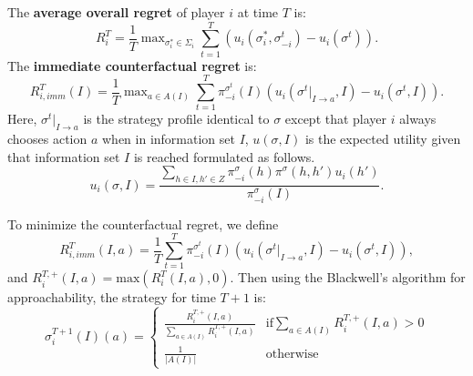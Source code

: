 \documentclass[twocolumn]{article}
\begin{document}
The \textbf{average overall regret} of player $i$ at time $T$ is:
\begin{equation}
    R^T_i = \frac{1}{T}\mathop{\text{max}}_{\sigma^{*}_i \in \Sigma_i}\sum_{t=1}^T(u_i(\sigma^{*}_i, \sigma^t_{-i}) - u_i(\sigma^t)).
\end{equation}
The \textbf{immediate counterfactual regret} is:
\begin{equation}
    R^T_{i,imm}(I) = \frac{1}{T}\mathop{\text{max}}_{a \in A(I)}\sum_{t=1}^T{\pi^{\sigma^t}_{-i}(I)(u_i(\sigma^t|_{I \rightarrow a}, I) - u_i(\sigma^t, I))}.
\end{equation}
Here, $\sigma^t|_{I \rightarrow a}$ is the strategy profile identical to $\sigma$ except that player $i$ always chooses action $a$ when in information set $I$, $u(\sigma, I)$ is the expected utility given that information set $I$ is reached formulated as follows.
\begin{equation}
    u_i(\sigma, I) = \frac{\sum_{h \in I, h' \in Z}\pi^\sigma_{-i}(h)\pi^\sigma(h,h')u_i(h')}{\pi^\sigma_{-i}(I)}.
\end{equation}

To minimize the counterfactual regret, we define
\begin{equation}
    R^T_{i,imm}(I,a) = \frac{1}{T}\sum_{t=1}^T{\pi^{\sigma^t}_{-i}(I)(u_i(\sigma^t|_{I \rightarrow a}, I) - u_i(\sigma^t, I))},
\end{equation}
and $R^{T,+}_i(I,a) = \text{max}(R^T_i(I,a),0)$. Then using the Blackwell's algorithm for approachability, the strategy for time $T+1$ is:
\begin{equation}
    \sigma^{T+1}_i(I)(a) = \begin{cases}
        \frac{R^{T,+}_i(I,a)}{\sum_{a \in A(I)}{R^{T,+}_i(I,a)}} & \text{if} \sum_{a \in A(I)}{R^{T,+}_i(I,a)} > 0 \\
        \frac{1}{|A(I)|} & \text{otherwise}
    \end{cases}
\end{equation}
\end{document}
